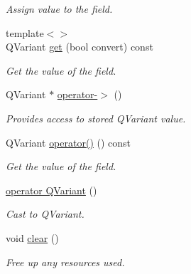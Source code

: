 \begin{DoxyCompactItemize}
\begin{DoxyCompactList}\small\item\em Assign value to the field. \item\end{DoxyCompactList}\item 
{\footnotesize template$<$$>$ }\\QVariant \hyperlink{classDQField_a7eb8d6686283fca855c3344b9ad77f36}{get} (bool convert) const
\begin{DoxyCompactList}\small\item\em Get the value of the field. \item\end{DoxyCompactList}\item 
\hypertarget{classDQBaseField_a4525fb1805a119e1f8a02a3097f8e475}{
QVariant $\ast$ \hyperlink{classDQBaseField_a4525fb1805a119e1f8a02a3097f8e475}{operator-\/$>$} ()}
\label{classDQBaseField_a4525fb1805a119e1f8a02a3097f8e475}

\begin{DoxyCompactList}\small\item\em Provides access to stored QVariant value. \item\end{DoxyCompactList}\item 
\hypertarget{classDQBaseField_a34625c95d2baf6794ab15a2c9adbe59e}{
QVariant \hyperlink{classDQBaseField_a34625c95d2baf6794ab15a2c9adbe59e}{operator()} () const }
\label{classDQBaseField_a34625c95d2baf6794ab15a2c9adbe59e}

\begin{DoxyCompactList}\small\item\em Get the value of the field. \item\end{DoxyCompactList}\item 
\hypertarget{classDQBaseField_a6cb1f4cb9501b27818453ec37570580f}{
\hyperlink{classDQBaseField_a6cb1f4cb9501b27818453ec37570580f}{operator QVariant} ()}
\label{classDQBaseField_a6cb1f4cb9501b27818453ec37570580f}

\begin{DoxyCompactList}\small\item\em Cast to QVariant. \item\end{DoxyCompactList}\item 
\hypertarget{classDQBaseField_a0c9970518c790bb356007470f0a6b8c1}{
void \hyperlink{classDQBaseField_a0c9970518c790bb356007470f0a6b8c1}{clear} ()}
\label{classDQBaseField_a0c9970518c790bb356007470f0a6b8c1}

\begin{DoxyCompactList}\small\item\em Free up any resources used. \item\end{DoxyCompactList}\end{DoxyCompactItemize}
